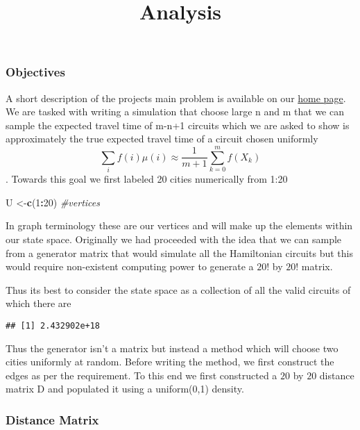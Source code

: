 \documentclass[
]{article}
\title{Analysis}
\author{}
\date{\vspace{-2.5em}}
\newenvironment{Shaded}{\begin{snugshade}}{\end{snugshade}}
\newcommand{\CommentTok}[1]{\textcolor[rgb]{0.56,0.35,0.01}{\textit{#1}}}
\newcommand{\DecValTok}[1]{\textcolor[rgb]{0.00,0.00,0.81}{#1}}
\newcommand{\KeywordTok}[1]{\textcolor[rgb]{0.13,0.29,0.53}{\textbf{#1}}}
\newcommand{\NormalTok}[1]{#1}
\newcommand{\OperatorTok}[1]{\textcolor[rgb]{0.81,0.36,0.00}{\textbf{#1}}}
\begin{document}
\maketitle

{
\setcounter{tocdepth}{3}
\tableofcontents
}
\hypertarget{objectives}{%
\subsubsection{Objectives}\label{objectives}}

A short description of the projects main problem is available on our
\href{index.html}{home page}. We are tasked with writing a simulation
that choose large n and m that we can sample the expected travel time of
m-n+1 circuits which we are asked to show is approximately the true
expected travel time of a circuit chosen uniformly
\[ \sum_{i} f(i)\mu(i) \approx \frac{1}{m+1} \sum_{k=0}^{m} f(X_k)\].
Towards this goal we first labeled 20 cities numerically from 1:20

\begin{Shaded}
\begin{Highlighting}[]
\NormalTok{U <-}\KeywordTok{c}\NormalTok{(}\DecValTok{1}\OperatorTok{:}\DecValTok{20}\NormalTok{) }\CommentTok{#vertices}
\end{Highlighting}
\end{Shaded}

In graph terminology these are our vertices and will make up the
elements within our state space. Originally we had proceeded with the
idea that we can sample from a generator matrix that would simulate all
the Hamiltonian circuits but this would require non-existent computing
power to generate a \(20!\) by \(20!\) matrix.

Thus its best to consider the state space as a collection of all the
valid circuits of which there are

\begin{verbatim}
## [1] 2.432902e+18
\end{verbatim}

Thus the generator isn't a matrix but instead a method which will choose
two cities uniformly at random. Before writing the method, we first
construct the edges as per the requirement. To this end we first
constructed a \(20\) by \(20\) distance matrix D and populated it using
a uniform(0,1) density.

\hypertarget{distance-matrix}{%
\subsubsection{Distance Matrix}\label{distance-matrix}}
\end{document}
